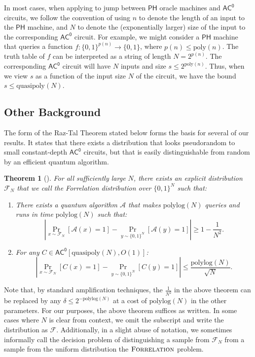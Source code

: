 \documentclass[11pt]{article}%
\newtheorem{theorem}{Theorem}
\newcommand{\poly}{\mathrm{poly}}
\newcommand{\polylog}{\mathrm{polylog}}
\newcommand{\quasipoly}{\mathrm{quasipoly}}
\newcommand{\Forrelation}{\normalfont\textsc{Forrelation}}
\begin{document}
In most cases, when applying  to jump between $\mathsf{PH}$ oracle machines and $\mathsf{AC^0}$ circuits, we follow the convention of using $n$ to denote the length of an input to the $\mathsf{PH}$ machine, and $N$ to denote the (exponentially larger) size of the input to the corresponding $\mathsf{AC^0}$ circuit. For example, we might consider a $\mathsf{PH}$ machine that queries a function $f: \{0,1\}^{p(n)} \to \{0,1\}$, where $p(n) \le \poly(n)$. The truth table of $f$ can be interpreted as a string of length $N = 2^{p(n)}$. The corresponding $\mathsf{AC^0}$ circuit will have $N$ inputs and size $s \le 2^{\poly(n)}$. Thus, when we view $s$ as a function of the input size $N$ of the circuit, we have the bound $s \le \quasipoly(N)$.

\subsection{Other Background}

The form of the Raz-Tal Theorem stated below forms the basis for several of our results. It states that there exists a distribution that looks pseudorandom to small constant-depth $\mathsf{AC^0}$ circuits, but that is easily distinguishable from random by an efficient quantum algorithm.

\begin{theorem}[{\cite[Theorem 1.2]{RT19}}]
\label{thm:raz-tal}
For all sufficiently large $N$, there exists an explicit distribution $\mathcal{F}_N$ that we call the \emph{Forrelation distribution} over $\{0,1\}^N$ such that:
\begin{enumerate}
\item There exists a quantum algorithm $\mathcal{A}$ that makes $\polylog(N)$ queries and runs in time $\polylog(N)$ such that:
\[
\left|\Pr_{x \sim \mathcal{F}_N} [\mathcal{A}(x) = 1] - \Pr_{y \sim \{0,1\}^{N}} [\mathcal{A}(y) = 1]  \right| \ge 1 - \frac{1}{N^2}.
\]
\item For any $C \in \mathsf{AC^0}[\quasipoly(N),O(1)]$:
\[
\left|\Pr_{x \sim \mathcal{F}_N} [C(x) = 1] - \Pr_{y \sim \{0,1\}^{N}} [C(y) = 1]  \right| \le \frac{\polylog(N)}{\sqrt{N}}.
\]
\end{enumerate}
\end{theorem}
Note that, by standard amplification techniques, the $\frac{1}{N^2}$ in the above theorem can be replaced by any $\delta \le 2^{-\polylog(N)}$ at a cost of $\polylog(N)$ in the other parameters. For our purposes, the above theorem suffices as written. In some cases where $N$ is clear from context, we omit the subscript and write the distribution as $\mathcal{F}$. Additionally, in a slight abuse of notation, we sometimes informally call the decision problem of distinguishing a sample from $\mathcal{F}_N$ from a sample from the uniform distribution the $\Forrelation$ problem.
\end{document}
